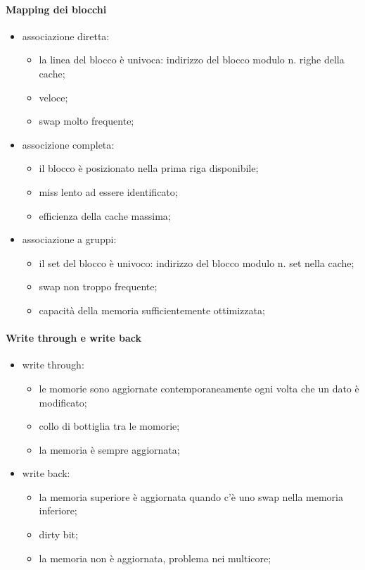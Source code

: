 \documentclass{article}
\begin{document}
\paragraph{Mapping dei blocchi}
\begin{itemize}
 \item associazione diretta:
 	\begin{itemize}
		\item la linea del blocco è univoca: indirizzo del blocco modulo n. righe della cache;
		\item veloce;
		\item swap molto frequente;
	\end{itemize}

 \item associzione completa:
 	\begin{itemize}
		\item il blocco è posizionato nella prima riga disponibile;
		\item miss lento ad essere identificato;
		\item efficienza della cache massima;
	\end{itemize}

 \item associazione a gruppi:
 	\begin{itemize}
		\item il set del blocco è univoco: indirizzo del blocco modulo n. set nella cache;
		\item swap non troppo frequente;
		\item capacità della memoria sufficientemente ottimizzata;
	\end{itemize}
\end{itemize}

\paragraph{Write through e write back}
\begin{itemize}
	\item write through:
	 \begin{itemize}
		 \item le momorie sono aggiornate contemporaneamente ogni volta che un dato è modificato;
		 \item collo di bottiglia tra le momorie;
		 \item la memoria è sempre aggiornata;
	 \end{itemize}

	\item write back:
	 \begin{itemize}
		 \item la memoria superiore è aggiornata quando c'è uno swap nella memoria inferiore;
		 \item dirty bit;
		 \item la memoria non è aggiornata, problema nei multicore;
	 \end{itemize}
 \end{itemize}
\end{document}
